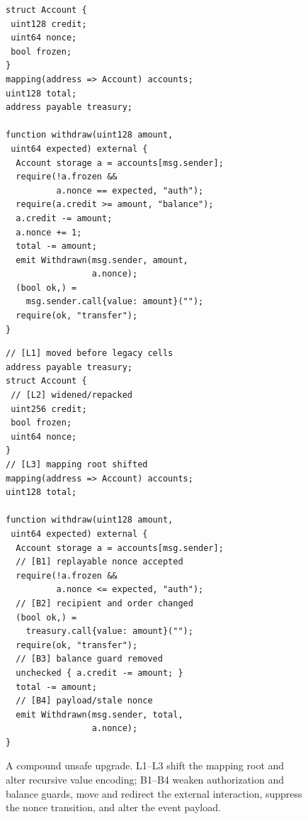\documentclass[runningheads]{llncs}
\begin{document}
\begin{figure}[t]
\centering
\begin{minipage}[t]{0.47\linewidth}
\begin{lstlisting}[caption={Old version.},captionpos=b]
struct Account {
 uint128 credit;
 uint64 nonce;
 bool frozen;
}
mapping(address => Account) accounts;
uint128 total;
address payable treasury;

function withdraw(uint128 amount,
 uint64 expected) external {
  Account storage a = accounts[msg.sender];
  require(!a.frozen &&
          a.nonce == expected, "auth");
  require(a.credit >= amount, "balance");
  a.credit -= amount;
  a.nonce += 1;
  total -= amount;
  emit Withdrawn(msg.sender, amount,
                 a.nonce);
  (bool ok,) =
    msg.sender.call{value: amount}("");
  require(ok, "transfer");
}
\end{lstlisting}
\end{minipage}\hfill
\begin{minipage}[t]{0.47\linewidth}
\begin{lstlisting}[caption={Candidate version.},captionpos=b]
// [L1] moved before legacy cells
address payable treasury;
struct Account {
 // [L2] widened/repacked
 uint256 credit;
 bool frozen;
 uint64 nonce;
}
// [L3] mapping root shifted
mapping(address => Account) accounts;
uint128 total;

function withdraw(uint128 amount,
 uint64 expected) external {
  Account storage a = accounts[msg.sender];
  // [B1] replayable nonce accepted
  require(!a.frozen &&
          a.nonce <= expected, "auth");
  // [B2] recipient and order changed
  (bool ok,) =
    treasury.call{value: amount}("");
  require(ok, "transfer");
  // [B3] balance guard removed
  unchecked { a.credit -= amount; }
  total -= amount;
  // [B4] payload/stale nonce
  emit Withdrawn(msg.sender, total,
                 a.nonce);
}
\end{lstlisting}
\end{minipage}
\caption{A compound unsafe upgrade.  L1--L3 shift the mapping root and alter recursive value encoding; B1--B4 weaken authorization and balance guards, move and redirect the external interaction, suppress the nonce transition, and alter the event payload.}
\label{fig:example}
\end{figure}
\end{document}
